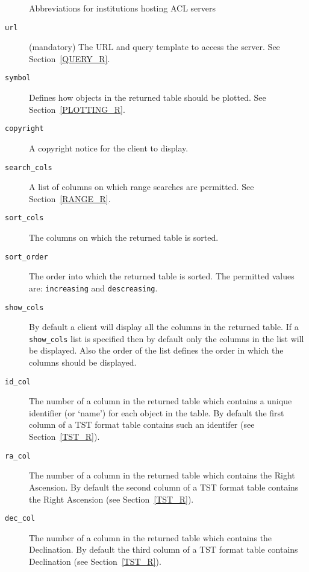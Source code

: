 \documentclass[twoside,11pt,nolof,chapters]{starlink}
\begin{document}
\begin{description}
\begin{table}[htbp]
\caption{Abbreviations for institutions hosting ACL servers
\label{REMINST} }

\end{table}

  \item[\texttt{url}] (mandatory) The URL and query template to access the
   server.  See Section~\ref{QUERY_R}.

  \item[\texttt{symbol}] Defines how objects in the returned table should
   be plotted.  See Section~\ref{PLOTTING_R}.

  \item[\texttt{copyright}] A copyright notice for the client to display.

  \item[\texttt{search\_cols}] A list of columns on which range searches
   are permitted.  See Section~\ref{RANGE_R}.

  \item[\texttt{sort\_cols}] The columns on which the returned table is
   sorted.

  \item[\texttt{sort\_order}] The order into which the returned table is
   sorted.  The permitted values are: \texttt{increasing} and \texttt{descreasing}.

  \item[\texttt{show\_cols}] By default a client will display all the
   columns in the returned table.  If a \texttt{show\_cols} list is specified
   then by default only the columns in the list will be displayed.  Also
   the order of the list defines the order in which the columns should be
   displayed.

  \item[\texttt{id\_col}] The number of a column in the returned table
   which contains a unique identifier (or `name') for each object in
   the table.  By default the first column of a TST format table contains
   such an identifer (see Section~\ref{TST_R}).

  \item[\texttt{ra\_col}] The number of a column in the returned table
   which contains the Right Ascension.  By default the second column of a
   TST format table contains the Right Ascension (see Section~\ref{TST_R}).

  \item[\texttt{dec\_col}] The number of a column in the returned table
   which contains the Declination.  By default the third column of a
   TST format table contains Declination (see Section~\ref{TST_R}).


\end{description}
\end{document}
